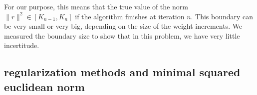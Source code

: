 \documentclass{article} %
\begin{document}
For our purpose, this means that the true value of the norm
$\lVert{r} \rVert^2 \in [K_{n-1}, K_n]$ if the algorithm finishes at iteration
$n$. This boundary can be very small or very big, depending on the size of the
weight increments. We measured the boundary size to show that in this problem,
we have very little incertitude.


\subsection{regularization methods and minimal squared euclidean norm}

% 
% 
\end{document}
